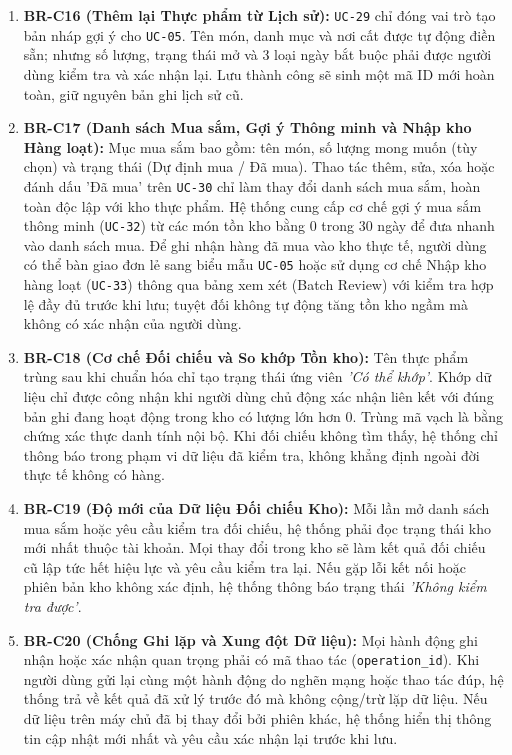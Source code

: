 \documentclass[10pt,a4paper]{article}
\begin{document}
\begin{enumerate}[leftmargin=2em,itemsep=6pt]
    \item \textbf{BR-C16 (Thêm lại Thực phẩm từ Lịch sử):} \texttt{UC-29} chỉ đóng vai trò tạo bản nháp gợi ý cho \texttt{UC-05}. Tên món, danh mục và nơi cất được tự động điền sẵn; nhưng số lượng, trạng thái mở và 3 loại ngày bắt buộc phải được người dùng kiểm tra và xác nhận lại. Lưu thành công sẽ sinh một mã ID mới hoàn toàn, giữ nguyên bản ghi lịch sử cũ.
    \item \textbf{BR-C17 (Danh sách Mua sắm, Gợi ý Thông minh và Nhập kho Hàng loạt):} Mục mua sắm bao gồm: tên món, số lượng mong muốn (tùy chọn) và trạng thái (Dự định mua / Đã mua). Thao tác thêm, sửa, xóa hoặc đánh dấu 'Đã mua' trên \texttt{UC-30} chỉ làm thay đổi danh sách mua sắm, hoàn toàn độc lập với kho thực phẩm. Hệ thống cung cấp cơ chế gợi ý mua sắm thông minh (\texttt{UC-32}) từ các món tồn kho bằng 0 trong 30 ngày để đưa nhanh vào danh sách mua. Để ghi nhận hàng đã mua vào kho thực tế, người dùng có thể bàn giao đơn lẻ sang biểu mẫu \texttt{UC-05} hoặc sử dụng cơ chế Nhập kho hàng loạt (\texttt{UC-33}) thông qua bảng xem xét (Batch Review) với kiểm tra hợp lệ đầy đủ trước khi lưu; tuyệt đối không tự động tăng tồn kho ngầm mà không có xác nhận của người dùng.
    \item \textbf{BR-C18 (Cơ chế Đối chiếu và So khớp Tồn kho):} Tên thực phẩm trùng sau khi chuẩn hóa chỉ tạo trạng thái ứng viên \textit{'Có thể khớp'}. Khớp dữ liệu chỉ được công nhận khi người dùng chủ động xác nhận liên kết với đúng bản ghi đang hoạt động trong kho có lượng lớn hơn 0. Trùng mã vạch là bằng chứng xác thực danh tính nội bộ. Khi đối chiếu không tìm thấy, hệ thống chỉ thông báo trong phạm vi dữ liệu đã kiểm tra, không khẳng định ngoài đời thực tế không có hàng.
    \item \textbf{BR-C19 (Độ mới của Dữ liệu Đối chiếu Kho):} Mỗi lần mở danh sách mua sắm hoặc yêu cầu kiểm tra đối chiếu, hệ thống phải đọc trạng thái kho mới nhất thuộc tài khoản. Mọi thay đổi trong kho sẽ làm kết quả đối chiếu cũ lập tức hết hiệu lực và yêu cầu kiểm tra lại. Nếu gặp lỗi kết nối hoặc phiên bản kho không xác định, hệ thống thông báo trạng thái \textit{'Không kiểm tra được'}.
    \item \textbf{BR-C20 (Chống Ghi lặp và Xung đột Dữ liệu):} Mọi hành động ghi nhận hoặc xác nhận quan trọng phải có mã thao tác (\texttt{operation\_id}). Khi người dùng gửi lại cùng một hành động do nghẽn mạng hoặc thao tác đúp, hệ thống trả về kết quả đã xử lý trước đó mà không cộng/trừ lặp dữ liệu. Nếu dữ liệu trên máy chủ đã bị thay đổi bởi phiên khác, hệ thống hiển thị thông tin cập nhật mới nhất và yêu cầu xác nhận lại trước khi lưu.

\end{enumerate}
\end{document}

